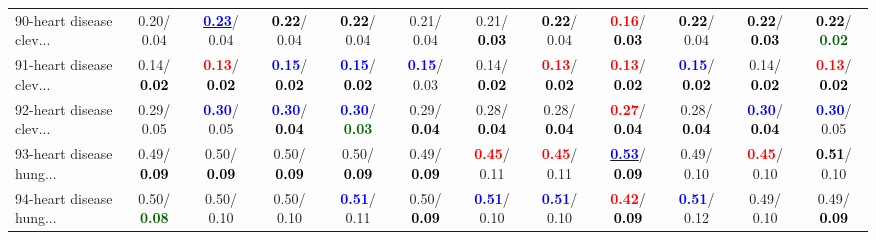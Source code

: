 \begin{table}[h]
\begin{center}
{\begin{tabular}{lc|c|c|c|c|c|c|c|c|c|c}
90-heart disease clev... &   0.20/  0.04 & \underline{\textcolor{blue}{\textbf{  0.23}}}/  0.04 & \textcolor{black}{\textbf{  0.22}}/  0.04 & \textcolor{black}{\textbf{  0.22}}/  0.04 &   0.21/  0.04 &   0.21/\textcolor{black}{\textbf{  0.03}} & \textcolor{black}{\textbf{  0.22}}/  0.04 & \textcolor{red}{\textbf{  0.16}}/\textcolor{black}{\textbf{  0.03}} & \textcolor{black}{\textbf{  0.22}}/  0.04 & \textcolor{black}{\textbf{  0.22}}/\textcolor{black}{\textbf{  0.03}} & \textcolor{black}{\textbf{  0.22}}/\textcolor{darkgreen}{\textbf{  0.02}} \\
91-heart disease clev... &   0.14/\textcolor{black}{\textbf{  0.02}} & \textcolor{red}{\textbf{  0.13}}/\textcolor{black}{\textbf{  0.02}} & \textcolor{blue}{\textbf{  0.15}}/\textcolor{black}{\textbf{  0.02}} & \textcolor{blue}{\textbf{  0.15}}/\textcolor{black}{\textbf{  0.02}} & \textcolor{blue}{\textbf{  0.15}}/  0.03 &   0.14/\textcolor{black}{\textbf{  0.02}} & \textcolor{red}{\textbf{  0.13}}/\textcolor{black}{\textbf{  0.02}} & \textcolor{red}{\textbf{  0.13}}/\textcolor{black}{\textbf{  0.02}} & \textcolor{blue}{\textbf{  0.15}}/\textcolor{black}{\textbf{  0.02}} &   0.14/\textcolor{black}{\textbf{  0.02}} & \textcolor{red}{\textbf{  0.13}}/\textcolor{black}{\textbf{  0.02}} \\
92-heart disease clev... &   0.29/  0.05 & \textcolor{blue}{\textbf{  0.30}}/  0.05 & \textcolor{blue}{\textbf{  0.30}}/\textcolor{black}{\textbf{  0.04}} & \textcolor{blue}{\textbf{  0.30}}/\textcolor{darkgreen}{\textbf{  0.03}} &   0.29/\textcolor{black}{\textbf{  0.04}} &   0.28/\textcolor{black}{\textbf{  0.04}} &   0.28/\textcolor{black}{\textbf{  0.04}} & \textcolor{red}{\textbf{  0.27}}/\textcolor{black}{\textbf{  0.04}} &   0.28/\textcolor{black}{\textbf{  0.04}} & \textcolor{blue}{\textbf{  0.30}}/\textcolor{black}{\textbf{  0.04}} & \textcolor{blue}{\textbf{  0.30}}/  0.05 \\ \hline
93-heart disease hung... &   0.49/\textcolor{black}{\textbf{  0.09}} &   0.50/\textcolor{black}{\textbf{  0.09}} &   0.50/\textcolor{black}{\textbf{  0.09}} &   0.50/\textcolor{black}{\textbf{  0.09}} &   0.49/\textcolor{black}{\textbf{  0.09}} & \textcolor{red}{\textbf{  0.45}}/  0.11 & \textcolor{red}{\textbf{  0.45}}/  0.11 & \underline{\textcolor{blue}{\textbf{  0.53}}}/\textcolor{black}{\textbf{  0.09}} &   0.49/  0.10 & \textcolor{red}{\textbf{  0.45}}/  0.10 & \textcolor{black}{\textbf{  0.51}}/  0.10 \\
94-heart disease hung... &   0.50/\textcolor{darkgreen}{\textbf{  0.08}} &   0.50/  0.10 &   0.50/  0.10 & \textcolor{blue}{\textbf{  0.51}}/  0.11 &   0.50/\textcolor{black}{\textbf{  0.09}} & \textcolor{blue}{\textbf{  0.51}}/  0.10 & \textcolor{blue}{\textbf{  0.51}}/  0.10 & \textcolor{red}{\textbf{  0.42}}/\textcolor{black}{\textbf{  0.09}} & \textcolor{blue}{\textbf{  0.51}}/  0.12 &   0.49/  0.10 &   0.49/\textcolor{black}{\textbf{  0.09}} \\

\end{tabular}}
\end{center}
\end{table}
